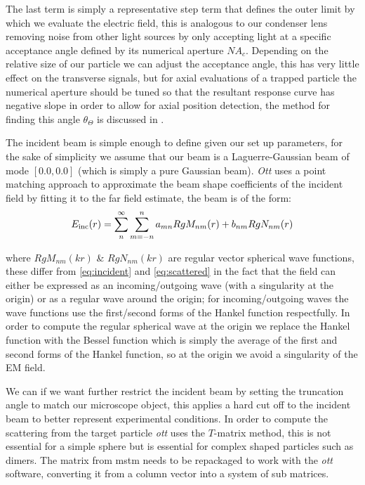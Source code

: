 The last term is simply a representative step term that defines the outer 
limit by which we evaluate the electric field, this is analogous to our 
condenser lens removing noise from other light sources by only accepting 
light at a specific acceptance angle defined by its numerical aperture 
$NA_c$. Depending on the relative size of our particle we can adjust 
the acceptance angle, this has very little effect on the transverse 
signals, but for axial evaluations of a trapped particle the numerical 
aperture should be tuned so that the resultant response curve has negative 
slope in order to allow for axial position detection, the method for 
finding this angle $\theta_\Theta$ is discussed in \cite{Friedrich2012}.

The incident beam is simple enough to define given our set up parameters, 
for the sake of simplicity we assume that our beam is a Laguerre-Gaussian 
beam of mode $[0.0, 0.0]$ (which is simply a pure Gaussian beam). 
\textit{Ott} uses a point matching approach to approximate the beam shape 
coefficients of the incident field by fitting it to the far field estimate, 
the beam is of the form:
\begin{align}
	E_{\rm inc}(r)=\sum^\infty_n\sum^n_{m=-n}a_{mn}RgM_{nm}(r)+b_{nm}RgN_{nm}(r)
\end{align}

where $RgM_{nm}(kr)$ \& $RgN_{nm}(kr)$ are regular vector spherical 
wave functions, these differ from \eqref{eq:incident} and 
\eqref{eq:scattered} in the fact that the field can either be 
expressed as an incoming/outgoing wave (with a 
singularity at the origin) or as a regular wave around the origin; for 
incoming/outgoing waves the wave functions use the first/second forms of 
the Hankel function respectfully. In order to compute the regular spherical 
wave at the origin we replace the Hankel function with the Bessel function 
which is simply the average of the first and second forms of the Hankel 
function, so at the origin we avoid a singularity of the EM field.  

We can if we want further restrict the incident beam by setting 
the truncation angle to match our microscope object, this applies a 
hard cut off to the incident beam to better represent experimental 
conditions. In order to compute the scattering from 
the target particle \textit{ott} uses the $T$-matrix method, this is not 
essential for a simple sphere but is essential for complex shaped particles 
such as dimers. The matrix from mstm needs to be repackaged to work with the
\textit{ott} software, converting it from a column vector into a system of 
sub matrices. 

